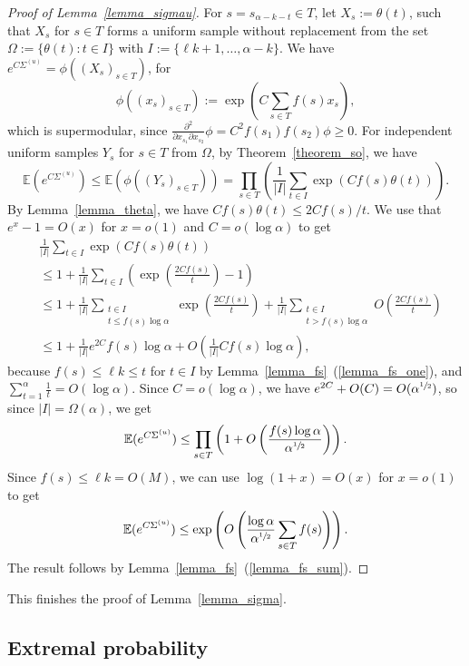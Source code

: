 \documentclass{article}
\theoremstyle{plain}
\theoremstyle{remark}
\theoremstyle{plain}
\numberwithin{equation}{section}
\begin{document}
	\begin{proof}[Proof of Lemma~\ref{lemma_sigmau}]
		For $s=s_{\alpha-k-t}\in T$, let $X_s:=\theta(t)$, such that $X_s$ for $s\in T$ forms a uniform sample without replacement from the set $\Omega:=\{\theta(t):t\in I\}$ with $I:=\{\ell k+1,\ldots,\alpha-k\}$. We have $e^{C\Sigma^{(u)}}=\phi((X_s)_{s\in T})$, for $$\phi((x_s)_{s\in T}):=\exp\left(C\sum_{s\in T}f(s)x_s\right),$$ which is supermodular, since $\frac{\partial^2}{\partial x_{s_1}\partial x_{s_2}}\phi=C^2f(s_1)f(s_2)\phi\geq0$. For independent uniform samples $Y_s$ for $s\in T$ from $\Omega$, by Theorem~\ref{theorem_so}, we have $$\mathbb{E}(e^{C\Sigma^{(u)}})\leq\mathbb{E}(\phi((Y_s)_{s\in T}))=\prod_{s\in T}\left(\frac1{|I|}\sum_{t\in I}\exp(Cf(s)\theta(t))\right).$$ By Lemma~\ref{lemma_theta}, we have $Cf(s)\theta(t)\leq2Cf(s)/t$. We use that $e^x-1=O(x)$ for $x=o(1)$ and $C=o(\log\alpha)$ to get
		\begin{align}
			&\frac1{|I|}\sum_{t\in I}\exp(Cf(s)\theta(t))
			\\&\leq1+\frac1{|I|}\sum_{t\in I}\left(\exp\left(\frac{2Cf(s)}{t}\right)-1\right)
			\\&\leq1+\frac1{|I|}\sum_{\substack{t\in I\\t\leq f(s)\log\alpha}}\exp\left(\frac{2Cf(s)}{t}\right)+\frac1{|I|}\sum_{\substack{t\in I\\t>f(s)\log\alpha}}O\left(\frac{2Cf(s)}{t}\right)
			\\&\leq1+\frac{1}{|I|}e^{2C}f(s)\log\alpha+O\left(\frac1{|I|}Cf(s)\log\alpha\right),
		\end{align}
		because $f(s)\leq\ell k\leq t$ for $t\in I$ by Lemma~\ref{lemma_fs}~(\ref{lemma_fs_one}), and $\sum_{t=1}^{\alpha}\frac1t=O(\log\alpha)$. Since $C=o(\log\alpha)$, we have $e^{2C}+O(C)=O(\alpha^{\sfrac12})$, so since $|I|=\Omega(\alpha)$, we get $$\mathbb{E}(e^{C\Sigma^{(u)}})\leq\prod_{s\in T}\left(1+O\left(\frac{f(s)\log\alpha}{\alpha^{\sfrac12}}\right)\right).$$ Since $f(s)\leq\ell k=O(M)$, we can use $\log(1+x)=O(x)$ for $x=o(1)$ to get $$\mathbb{E}(e^{C\Sigma^{(u)}})\leq\exp\left(O\left(\frac{\log\alpha}{\alpha^{\sfrac12}}\sum_{s\in T}f(s)\right)\right).$$ The result follows by Lemma~\ref{lemma_fs}~(\ref{lemma_fs_sum}).
	\end{proof}
	
	This finishes the proof of Lemma~\ref{lemma_sigma}.
	
	\subsection{Extremal probability}\label{subsection_proof_remaining}
	
\end{document}
